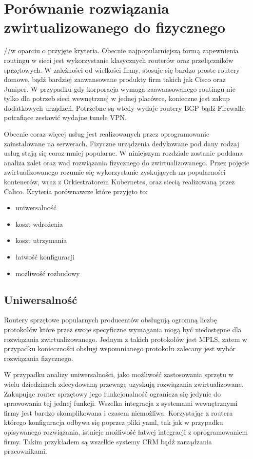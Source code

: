 \documentclass[pl,final,oneside]{mgr} %
\begin{document}
\chapter{Porównanie rozwiązania zwirtualizowanego do fizycznego} 

//w oparciu o przyjęte kryteria.
Obecnie najpopularniejszą formą zapewnienia routingu w sieci jest wykorzystanie klasycznych routerów oraz przełączników sprzętowych. W zależności od wielkości firmy, stosuje się bardzo proste routery domowe, bądź bardziej zaawansowane produkty firm takich jak Cisco oraz Juniper. W przypadku gdy korporacja wymaga zaawansowanego routingu nie tylko dla potrzeb sieci wewnętrznej w jednej placówce, konieczne jest zakup dodatkowych urządzeń. Potrzebne są wtedy wydaje routery BGP bądź Firewalle potrafiące zestawić wydajne tunele VPN. 

Obecnie coraz więcej usług jest realizowanych przez oprogramowanie zainstalowane na serwerach. Fizyczne urządzenia dedykowane pod dany rodzaj usług stają się coraz mniej popularne. W niniejszym rozdziale zostanie poddana analiza zalet oraz wad rozwiązania fizycznego do zwirtualizowanego. Przez pojęcie zwirtualizowanego rozumie się wykorzystanie zyskujących na popularności kontenerów, wraz z Orkiestratorem Kubernetes, oraz siecią realizowaną przez Calico. Kryteria porównawcze które przyjęto to:
\begin{itemize}
	\item uniwersalność
	\item koszt wdrożenia
	\item koszt utrzymania
	\item łatwość konfiguracji
	\item możliwość rozbudowy
\end{itemize}

\section{Uniwersalność}
Routery sprzętowe popularnych producentów obsługują ogromną liczbę protokołów które przez swoje specyficzne wymagania mogą być niedostępne dla rozwiązania zwirtualizowanego. Jednym z takich protokołów jest MPLS, zatem w przypadku konieczności obsługi wspomnianego protokołu zalecany jest wybór rozwiązania fizycznego.

W przypadku analizy uniwersalności, jako możliwość zastosowania sprzętu w wielu dziedzinach zdecydowaną przewagę uzyskują rozwiązania zwirtualizowane. Zakupując router sprzętowy jego funkcjonalność ogranicza się jedynie do sprawowania tej jednej funkcji. Wszelka integracja z systemami wewnętrznymi firmy jest bardzo skomplikowana i czasem niemożliwa. Korzystając z routera którego konfiguracja odbywa się poprzez pliki yaml, tak jak w przypadku opisywanego rozwiązania, istnieje możliwość łatwej integracji z oprogramowaniem firmy. Takim przykładem są wszelkie systemy CRM bądź zarządzania pracownikami. 
\end{document}
